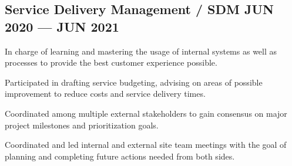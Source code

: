 \documentclass[letter,10pt]{article}
\begin{document}
\subsection{{Service Delivery Management / SDM \hfill JUN 2020 --- JUN 2021}}
\newline
{}
\begin{zitemize}
\item In charge of learning and mastering the usage of internal systems as well as processes to provide the best customer experience possible.
\item Participated in drafting service budgeting, advising on areas of possible improvement to reduce costs and service delivery times.
\item Coordinated among multiple external stakeholders to gain consensus on major project milestones and prioritization goals.
\item Coordinated and led internal and external site team meetings with the goal of planning and completing future actions needed from both sides.
\end{zitemize}
\newline


\end{document}
